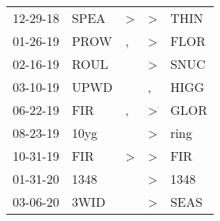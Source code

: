 \begin{supertabular}{p{0.07\textwidth}p{0.06\textwidth}p{0.02\textwidth}p{0.02\textwidth}p{0.06\textwidth}}
          12-29-18\textsuperscript{} &           SPEA\textsuperscript{} &     \textgreater &     \textgreater &           THIN\textsuperscript{} \\
          01-26-19\textsuperscript{} &           PROW\textsuperscript{} &                , &     \textgreater &           FLOR\textsuperscript{} \\
          02-16-19\textsuperscript{} &           ROUL\textsuperscript{} &                  &     \textgreater &           SNUC\textsuperscript{} \\
          03-10-19\textsuperscript{} &           UPWD\textsuperscript{} &                  &                , &           HIGG\textsuperscript{} \\
          06-22-19\textsuperscript{} &            FIR\textsuperscript{} &                , &     \textgreater &           GLOR\textsuperscript{} \\
          08-23-19\textsuperscript{} &           10yg\textsuperscript{} &                  &     \textgreater &           ring\textsuperscript{} \\
          10-31-19\textsuperscript{} &            FIR\textsuperscript{} &     \textgreater &     \textgreater &            FIR\textsuperscript{} \\
          01-31-20\textsuperscript{} &           1348\textsuperscript{} &                  &     \textgreater &           1348\textsuperscript{} \\
          03-06-20\textsuperscript{} &           3WID\textsuperscript{} &                  &     \textgreater &           SEAS\textsuperscript{} \\
\end{supertabular}
